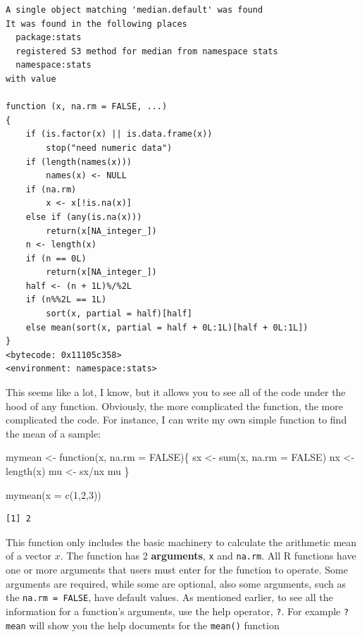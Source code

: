\documentclass[
  letterpaper,
  DIV=11,
  numbers=noendperiod]{scrreprt}
\newenvironment{Shaded}{\begin{snugshade}}{\end{snugshade}}
\newcommand{\AttributeTok}[1]{\textcolor[rgb]{0.40,0.45,0.13}{#1}}
\newcommand{\ConstantTok}[1]{\textcolor[rgb]{0.56,0.35,0.01}{#1}}
\newcommand{\ControlFlowTok}[1]{\textcolor[rgb]{0.00,0.23,0.31}{#1}}
\newcommand{\DecValTok}[1]{\textcolor[rgb]{0.68,0.00,0.00}{#1}}
\newcommand{\FunctionTok}[1]{\textcolor[rgb]{0.28,0.35,0.67}{#1}}
\newcommand{\NormalTok}[1]{\textcolor[rgb]{0.00,0.23,0.31}{#1}}
\newcommand{\OtherTok}[1]{\textcolor[rgb]{0.00,0.23,0.31}{#1}}
\newcommand{\SpecialCharTok}[1]{\textcolor[rgb]{0.37,0.37,0.37}{#1}}
\begin{document}
\begin{verbatim}
A single object matching 'median.default' was found
It was found in the following places
  package:stats
  registered S3 method for median from namespace stats
  namespace:stats
with value

function (x, na.rm = FALSE, ...) 
{
    if (is.factor(x) || is.data.frame(x)) 
        stop("need numeric data")
    if (length(names(x))) 
        names(x) <- NULL
    if (na.rm) 
        x <- x[!is.na(x)]
    else if (any(is.na(x))) 
        return(x[NA_integer_])
    n <- length(x)
    if (n == 0L) 
        return(x[NA_integer_])
    half <- (n + 1L)%/%2L
    if (n%%2L == 1L) 
        sort(x, partial = half)[half]
    else mean(sort(x, partial = half + 0L:1L)[half + 0L:1L])
}
<bytecode: 0x11105c358>
<environment: namespace:stats>
\end{verbatim}

This seems like a lot, I know, but it allows you to see all of the code
under the hood of any function. Obviously, the more complicated the
function, the more complicated the code. For instance, I can write my
own simple function to find the mean of a sample:

\begin{Shaded}
\begin{Highlighting}[]
\NormalTok{mymean }\OtherTok{\textless{}{-}} \ControlFlowTok{function}\NormalTok{(x,}
                   \AttributeTok{na.rm =} \ConstantTok{FALSE}\NormalTok{)\{}
\NormalTok{  sx }\OtherTok{\textless{}{-}} \FunctionTok{sum}\NormalTok{(x, }
            \AttributeTok{na.rm =} \ConstantTok{FALSE}\NormalTok{)}
\NormalTok{  nx }\OtherTok{\textless{}{-}} \FunctionTok{length}\NormalTok{(x)}
\NormalTok{  mu }\OtherTok{\textless{}{-}}\NormalTok{ sx}\SpecialCharTok{/}\NormalTok{nx}
\NormalTok{  mu}
\NormalTok{\}}

\FunctionTok{mymean}\NormalTok{(}\AttributeTok{x =} \FunctionTok{c}\NormalTok{(}\DecValTok{1}\NormalTok{,}\DecValTok{2}\NormalTok{,}\DecValTok{3}\NormalTok{))}
\end{Highlighting}
\end{Shaded}

\begin{verbatim}
[1] 2
\end{verbatim}

This function only includes the basic machinery to calculate the
arithmetic mean of a vector \(x\). The function has 2
\textbf{arguments}, \texttt{x} and \texttt{na.rm}. All R functions have
one or more arguments that users must enter for the function to operate.
Some arguments are required, while some are optional, also some
arguments, such as the \texttt{na.rm\ =\ FALSE}, have default values. As
mentioned earlier, to see all the information for a function's
arguments, use the help operator, \texttt{?}. For example \texttt{?mean}
will show you the help documents for the \texttt{mean()} function
\end{document}

